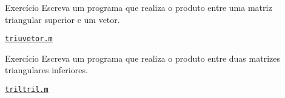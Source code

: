 \documentclass[hyperref={pdfpagelabels=false}]{beamer}
\begin{document}
\begin{frame}{Exercício}
  Escreva um programa que realiza o produto entre uma matriz triangular superior e um vetor.
  \vfill
  \begin{center} \href{listings/triuvetor.m}{\underline{\texttt{triuvetor.m}}} \end{center}
\end{frame}

\begin{frame}{Exercício}
  Escreva um programa que realiza o produto entre duas matrizes triangulares inferiores.
  \vfill
  \begin{center} \href{listings/triltril.m}{\underline{\texttt{triltril.m}}} \end{center}
\end{frame}
\end{document}
